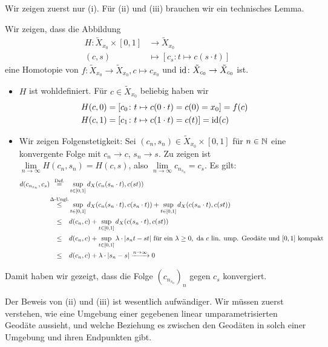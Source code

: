 \begin{beweis}
	Wir zeigen zuerst nur (i).
	Für (ii) und (iii) brauchen wir ein technisches Lemma.
	
	Wir zeigen, dass die Abbildung
	\begin{align*}
		H\colon \tilde{X}_{x_0} \times [0,1] &\longrightarrow \tilde{X}_{x_0} \\
		(c,s) &\longmapsto [c_s \colon t \mapsto c(s \cdot t)]
	\end{align*}
	eine Homotopie von $f\colon \tilde{X}_{x_0} \rightarrow \tilde{X}_{x_0}, c \mapsto c_{x_0}$ und $\operatorname{id}\colon \tilde{X}_{c_0} \rightarrow \tilde{X}_{c_0}$ ist.
	\begin{itemize}
		\item $H$ ist wohldefiniert.
		Für $c \in \tilde{X}_{x_0}$ beliebig haben wir
		\begin{align*}
			H(c,0) &= [c_0 \colon t \mapsto c(0 \cdot t) = c(0) = x_0] = f(c) \\
			H(c,1) &= [c_1 \colon t \mapsto c(1 \cdot t) = c(t)] = \operatorname{id}(c)
		\end{align*}
		\item Wir zeigen Folgenstetigkeit:
		Sei $(c_n,s_n) \in \tilde{X}_{x_0} \times [0,1]$ für $n \in \mathbb{N}$ eine konvergente Folge mit $c_n \rightarrow c$, $s_n \rightarrow s$.
		Zu zeigen ist $\lim\limits_{n \rightarrow \infty} H(c_n,s_n) = H(c,s)$, also $\lim\limits_{n \rightarrow \infty} c_{n_{s_n}} = c_s$.
		Es gilt:
		\begin{align*}
			d(c_{n_{s_n}},c_s) &\stack{\text{Def.}}{=} \sup_{t \in [0,1]} d_X(c_n(s_n \cdot t),c(st)) \\
			&\stack{\Delta\text{-Ungl.}}{\leq} \sup_{t \in [0,1]} d_X(c_n(s_n \cdot t),c(s_n \cdot t)) + \sup_{t \in [0,1]} d_X(c(s_n \cdot t),c(st)) \\
			&\stack{}{\leq} d(c_n,c) + \sup_{t \in [0,1]} d_X(c(s_n \cdot t), c(st)) \\
			&\stack{}{\leq} d(c_n,c) + \sup_{t \in [0,1]} \lambda \cdot \abs{s_n t - st} \text{ für ein } \lambda \geq 0, \text{ da } c \text{ lin. ump. Geodäte und } [0,1] \text{ kompakt} \\
			&\stack{}{\leq} d(c_n,c) + \lambda \cdot \abs{s_n-s} \xrightarrow{n \rightarrow \infty} 0
		\end{align*}
	\end{itemize}
	Damit haben wir gezeigt, dass die Folge $(c_{n_{s_n}})_n$ gegen $c_s$ konvergiert. \qedhere
\end{beweis}

Der Beweis von (ii) und (iii) ist wesentlich aufwändiger.
Wir müssen zuerst verstehen, wie eine Umgebung einer gegebenen linear umparametrisierten Geodäte aussieht, und welche Beziehung es zwischen den Geodäten in solch einer Umgebung und ihren Endpunkten gibt.

